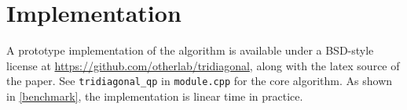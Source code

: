 \documentclass[11pt]{article}
\begin{document}
\section{Implementation}

A prototype implementation of the algorithm is available under a BSD-style license at \url{https://github.com/otherlab/tridiagonal}, along with the latex source of the paper.
See \verb+tridiagonal_qp+ in \verb+module.cpp+ for the core algorithm.  As shown in \cref{benchmark}, the implementation is linear time in practice.



\end{document}

